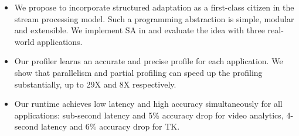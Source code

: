 \begin{itemize}[leftmargin=16pt]

\item We propose to incorporate structured adaptation as a first-class citizen
  in the stream processing model. Such a programming abstraction is simple,
  modular and extensible. We implement SA in \sysname{} and evaluate the idea
  with three real-world applications.

\item Our profiler learns an accurate and precise profile for each
  application. We show that parallelism and partial profiling can speed up the
  profiling substantially, up to 29X and 8X respectively.

\item Our runtime achieves low latency and high accuracy simultaneously for all
  applications: sub-second latency and 5\% accuracy drop for video analytics,
  4-second latency and 6\% accuracy drop for TK.

\end{itemize}


